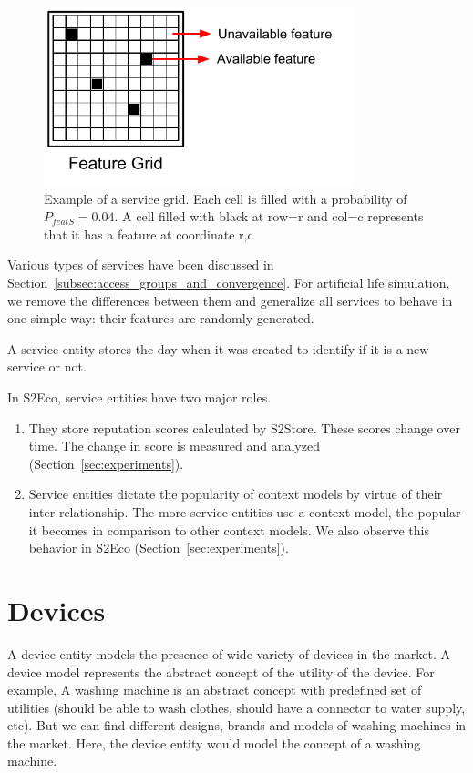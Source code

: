 \begin{figure}[!htb]
  \centering
  \includegraphics[width=9cm]{figures/example_service_grid.pdf}
  \caption{Example of a service grid. Each cell is filled with a probability of $P_{featS}=0.04$. A cell filled with black at row=r and col=c represents that it has a feature at coordinate r,c}
  \label{fig:example-service-grid}
\end{figure}

Various types of services have been discussed in Section~\ref{subsec:access_groups_and_convergence}. For artificial life simulation, we remove the differences between them and generalize all services to behave in one simple way: their features are randomly generated.

A service entity stores the day when it was created to identify if it is a new service or not. 

In S2Eco, service entities have two major roles.

\begin{enumerate}
  \item They store reputation scores calculated by S2Store. These scores change over time. The change in score is measured and analyzed (Section~\ref{sec:experiments}).
  \item Service entities dictate the popularity of context models by virtue of their inter-relationship. The more service entities use a context model, the popular it becomes in comparison to other context models. We also observe this behavior in S2Eco (Section~\ref{sec:experiments}).
\end{enumerate}

\section{Devices}
\label{sec:devices}

A device entity models the presence of wide variety of devices in the market. A device model represents the abstract concept of the utility of the device. For example, A washing machine is an abstract concept with predefined set of utilities (should be able to wash clothes, should have a connector to water supply, etc). But we can find different designs, brands and models of washing machines in the market. Here, the device entity would model the concept of a washing machine.

